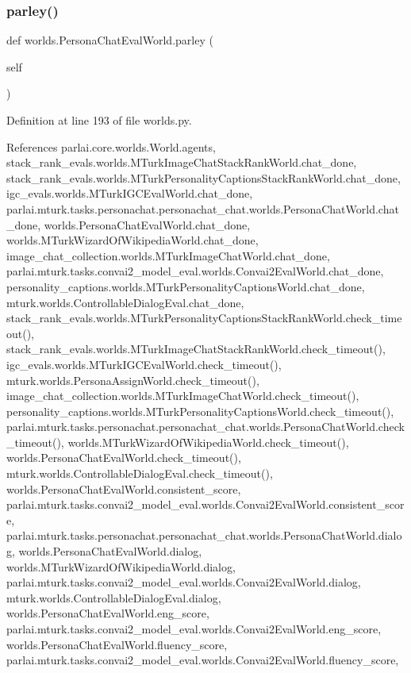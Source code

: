 \subsubsection{\texorpdfstring{parley()}{parley()}}
{\footnotesize\ttfamily def worlds.\+Persona\+Chat\+Eval\+World.\+parley (\begin{DoxyParamCaption}\item[{}]{self }\end{DoxyParamCaption})}



Definition at line 193 of file worlds.\+py.



References parlai.\+core.\+worlds.\+World.\+agents, stack\+\_\+rank\+\_\+evals.\+worlds.\+M\+Turk\+Image\+Chat\+Stack\+Rank\+World.\+chat\+\_\+done, stack\+\_\+rank\+\_\+evals.\+worlds.\+M\+Turk\+Personality\+Captions\+Stack\+Rank\+World.\+chat\+\_\+done, igc\+\_\+evals.\+worlds.\+M\+Turk\+I\+G\+C\+Eval\+World.\+chat\+\_\+done, parlai.\+mturk.\+tasks.\+personachat.\+personachat\+\_\+chat.\+worlds.\+Persona\+Chat\+World.\+chat\+\_\+done, worlds.\+Persona\+Chat\+Eval\+World.\+chat\+\_\+done, worlds.\+M\+Turk\+Wizard\+Of\+Wikipedia\+World.\+chat\+\_\+done, image\+\_\+chat\+\_\+collection.\+worlds.\+M\+Turk\+Image\+Chat\+World.\+chat\+\_\+done, parlai.\+mturk.\+tasks.\+convai2\+\_\+model\+\_\+eval.\+worlds.\+Convai2\+Eval\+World.\+chat\+\_\+done, personality\+\_\+captions.\+worlds.\+M\+Turk\+Personality\+Captions\+World.\+chat\+\_\+done, mturk.\+worlds.\+Controllable\+Dialog\+Eval.\+chat\+\_\+done, stack\+\_\+rank\+\_\+evals.\+worlds.\+M\+Turk\+Personality\+Captions\+Stack\+Rank\+World.\+check\+\_\+timeout(), stack\+\_\+rank\+\_\+evals.\+worlds.\+M\+Turk\+Image\+Chat\+Stack\+Rank\+World.\+check\+\_\+timeout(), igc\+\_\+evals.\+worlds.\+M\+Turk\+I\+G\+C\+Eval\+World.\+check\+\_\+timeout(), mturk.\+worlds.\+Persona\+Assign\+World.\+check\+\_\+timeout(), image\+\_\+chat\+\_\+collection.\+worlds.\+M\+Turk\+Image\+Chat\+World.\+check\+\_\+timeout(), personality\+\_\+captions.\+worlds.\+M\+Turk\+Personality\+Captions\+World.\+check\+\_\+timeout(), parlai.\+mturk.\+tasks.\+personachat.\+personachat\+\_\+chat.\+worlds.\+Persona\+Chat\+World.\+check\+\_\+timeout(), worlds.\+M\+Turk\+Wizard\+Of\+Wikipedia\+World.\+check\+\_\+timeout(), worlds.\+Persona\+Chat\+Eval\+World.\+check\+\_\+timeout(), mturk.\+worlds.\+Controllable\+Dialog\+Eval.\+check\+\_\+timeout(), worlds.\+Persona\+Chat\+Eval\+World.\+consistent\+\_\+score, parlai.\+mturk.\+tasks.\+convai2\+\_\+model\+\_\+eval.\+worlds.\+Convai2\+Eval\+World.\+consistent\+\_\+score, parlai.\+mturk.\+tasks.\+personachat.\+personachat\+\_\+chat.\+worlds.\+Persona\+Chat\+World.\+dialog, worlds.\+Persona\+Chat\+Eval\+World.\+dialog, worlds.\+M\+Turk\+Wizard\+Of\+Wikipedia\+World.\+dialog, parlai.\+mturk.\+tasks.\+convai2\+\_\+model\+\_\+eval.\+worlds.\+Convai2\+Eval\+World.\+dialog, mturk.\+worlds.\+Controllable\+Dialog\+Eval.\+dialog, worlds.\+Persona\+Chat\+Eval\+World.\+eng\+\_\+score, parlai.\+mturk.\+tasks.\+convai2\+\_\+model\+\_\+eval.\+worlds.\+Convai2\+Eval\+World.\+eng\+\_\+score, worlds.\+Persona\+Chat\+Eval\+World.\+fluency\+\_\+score, parlai.\+mturk.\+tasks.\+convai2\+\_\+model\+\_\+eval.\+worlds.\+Convai2\+Eval\+World.\+fluency\+\_\+score, 